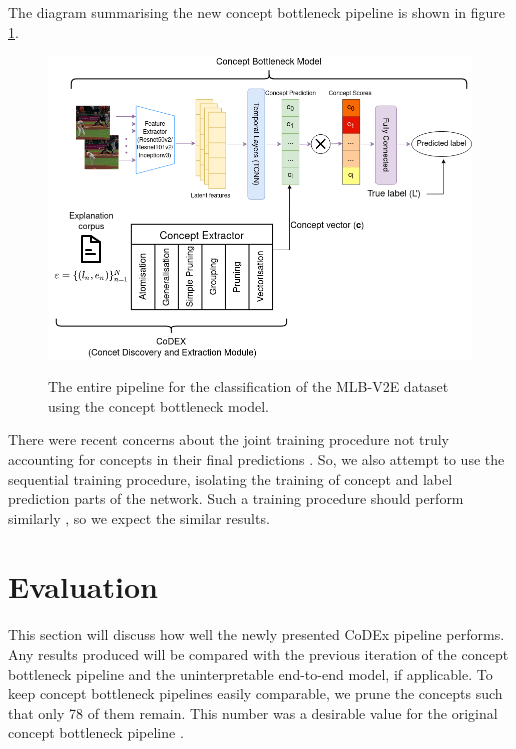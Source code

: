 The diagram summarising the new concept bottleneck pipeline is shown in figure \ref{full-architecture-diagram}.

\begin{figure}[h]
\caption{The entire pipeline for the classification of the MLB-V2E dataset using the concept bottleneck model.} 
\centering
\includegraphics[width=\textwidth]{concept-bottleneck-pipeline/new-concept-bottleneck-pipeline.png}
\label{full-architecture-diagram}
\end{figure}

There were recent concerns about the joint training procedure not truly accounting for concepts in their final predictions \cite{RefWorks:RefID:68-margeloiu2021concept}. 
So, we also attempt to use the sequential training procedure, isolating the training of concept and label prediction parts of the network.
Such a training procedure should perform similarly \cite{RefWorks:RefID:35-koh2020concept}, so we expect the similar results.

\section{Evaluation}

This section will discuss how well the newly presented CoDEx pipeline performs.
Any results produced will be compared with the previous iteration of the concept bottleneck pipeline and the uninterpretable end-to-end model, if applicable.
To keep concept bottleneck pipelines easily comparable, we prune the concepts such that only 78 of them remain.
This number was a desirable value for the original concept bottleneck pipeline \cite{RefWorks:RefID:16-2021automatic}.

